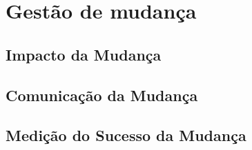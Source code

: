 \chapter{Gestão de mudança}



\section*{Impacto da Mudança}

\section*{Comunicação da Mudança}

\section*{Medição do Sucesso da Mudança}
